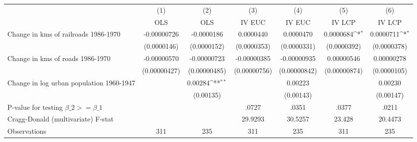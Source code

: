 {
\def\sym#1{\ifmmode^{#1}\else\(^{#1}\)\fi}
\begin{tabular}{l*{6}{c}}
\hline\hline
                &\multicolumn{1}{c}{(1)}&\multicolumn{1}{c}{(2)}&\multicolumn{1}{c}{(3)}&\multicolumn{1}{c}{(4)}&\multicolumn{1}{c}{(5)}&\multicolumn{1}{c}{(6)}\\
                &\multicolumn{1}{c}{OLS}&\multicolumn{1}{c}{OLS}&\multicolumn{1}{c}{IV EUC}&\multicolumn{1}{c}{IV EUC}&\multicolumn{1}{c}{IV LCP}&\multicolumn{1}{c}{IV LCP}\\
\hline
Change in kms of railroads 1986-1970&-0.00000726         &-0.0000186         &0.0000440         &0.0000470         &0.0000684\sym{*}  &0.0000711\sym{*}  \\
                &(0.0000146)         &(0.0000152)         &(0.0000353)         &(0.0000331)         &(0.0000392)         &(0.0000378)         \\
[1em]
Change in kms of roads 1986-1970&-0.00000570         &-0.00000723         &-0.00000385         &-0.00000935         &0.00000546         &0.00000278         \\
                &(0.00000427)         &(0.00000485)         &(0.00000756)         &(0.00000842)         &(0.00000874)         &(0.0000105)         \\
[1em]
Change in log urban population 1960-1947&                  &  0.00284\sym{**} &                  &  0.00223         &                  &  0.00230         \\
                &                  &(0.00135)         &                  &(0.00143)         &                  &(0.00147)         \\
\hline
P-value for testing $\beta\_{2} >= \beta\_{1}$&                  &                  &    .0727         &    .0351         &    .0377         &    .0211         \\
Cragg-Donald (multivariate) F-stat&                  &                  &  29.9293         &  30.5257         &   23.428         &  20.4473         \\
Observations    &      311         &      235         &      311         &      235         &      311         &      235         \\
\hline\hline
\end{tabular}
}
